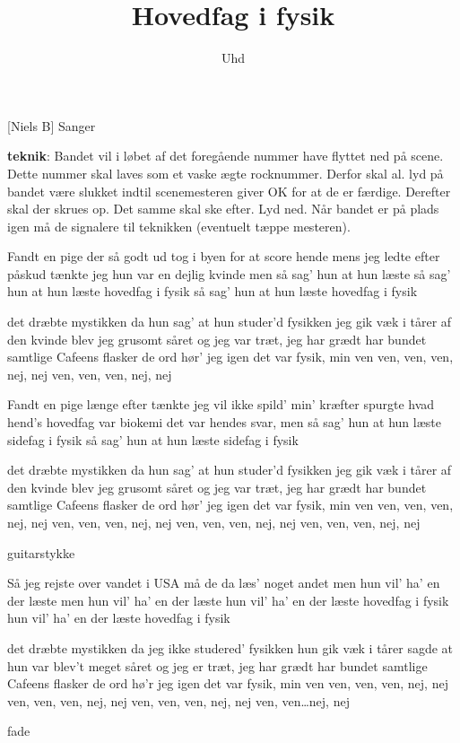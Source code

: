 \documentclass[a4paper,11pt]{article}
\title{Hovedfag i fysik}
\author{Uhd}
\begin{document}
\maketitle

\begin{roles}
  [Niels B] Sanger
\end{roles}

\begin{props}
\end{props}

\scene \textbf{teknik}: Bandet vil i løbet af det foregående nummer
have flyttet ned på scene. Dette nummer skal laves som et vaske ægte
rocknummer. Derfor skal al. lyd på bandet være slukket indtil
scenemesteren giver OK for at de er færdige. Derefter skal der skrues
op. Det samme skal ske efter. Lyd ned. Når bandet er på plads igen må
de signalere til teknikken (eventuelt tæppe mesteren).

\begin{song}

  Fandt en pige der så godt ud
  tog i byen for at score hende
  mens jeg ledte efter påskud
  tænkte jeg hun var en dejlig kvinde
  men så sag' hun at hun læste
  så sag' hun at hun læste hovedfag i fysik
  så sag' hun at hun læste hovedfag i fysik
  
  det dræbte mystikken
  da hun sag' at hun studer'd fysikken
  jeg gik væk i tårer
  af den kvinde blev jeg grusomt såret
  og jeg var træt, jeg har grædt
  har bundet samtlige Cafeens flasker
  de ord hør' jeg igen
  det var fysik, min ven
  ven, ven, ven, nej, nej
  ven, ven, ven, nej, nej
  
  Fandt en pige længe efter
  tænkte jeg vil ikke spild' min' kræfter
  spurgte hvad hend's hovedfag var
  biokemi det var hendes svar, men
  så sag' hun at hun læste sidefag i fysik
  så sag' hun at hun læste sidefag i fysik
  
  det dræbte mystikken
  da hun sag' at hun studer'd fysikken
  jeg gik væk i tårer
  af den kvinde blev jeg grusomt såret
  og jeg var træt, jeg har grædt
  har bundet samtlige Cafeens flasker
  de ord hør' jeg igen
  det var fysik, min ven
  ven, ven, ven, nej, nej
  ven, ven, ven, nej, nej
  ven, ven, ven, nej, nej
  ven, ven, ven, nej, nej

  \scene guitarstykke  

  Så jeg rejste over vandet
  i USA må de da læs' noget andet
  men hun vil' ha' en der læste
  men hun vil' ha' en der læste
  hun vil' ha' en der læste hovedfag i fysik
  hun vil' ha' en der læste hovedfag i fysik
  
  det dræbte mystikken
  da jeg ikke studered' fysikken
  hun gik væk i tårer
  sagde at hun var blev't meget såret
  og jeg er træt, jeg har grædt
  har bundet samtlige Cafeens flasker
  de ord hø'r jeg igen
  det var fysik, min ven
  ven, ven, ven, nej, nej
  ven, ven, ven, nej, nej
  ven, ven, ven, nej, nej
  ven, ven\ldots nej, nej

  
  \scene fade

\end{song}
\end{document}
